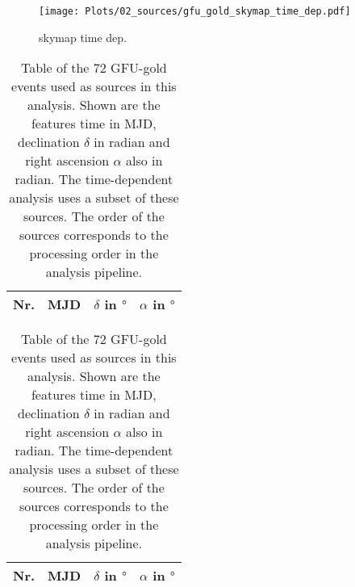 \begin{figure}
    \centering
    \texttt{[image: Plots/02\_sources/gfu\_gold\_skymap\_time\_dep.pdf]}
    \label{fig:skymap_2}
    \caption{skymap time dep.}
\end{figure}

\begin{table}[!htb]
  \caption{Table of the 72 GFU-gold events used as sources in this analysis. Shown are the features time in MJD, declination $\delta$ in radian and right ascension $\alpha$ also in radian. The time-dependent analysis uses a subset of these sources. The order of the sources corresponds to the processing order in the analysis pipeline.}
  \label{tab:sources}
  \begin{subtable}{.5\linewidth}
  \centering
  \begin{tabular}{ccrr}
    \toprule
    Nr. & MJD &  $\delta$ in $\si{\degree}$ & $\alpha$ in $\si{\degree}$ \\
    \toprule
    
    \toprule
  \end{tabular}
\end{subtable}
\begin{subtable}{.5\linewidth}
\centering
  \begin{tabular}{ccrr}
    \toprule
    Nr. & MJD &  $\delta$ in $\si{\degree}$ & $\alpha$ in $\si{\degree}$ \\
    \toprule
    
    \toprule
  \end{tabular}
  \end{subtable}
\end{table}
